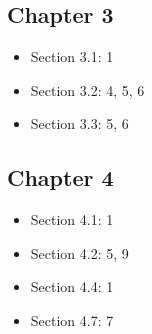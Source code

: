 \documentclass[11pt]{article}
\theoremstyle{definition}
\begin{document}
\subsection{Chapter 3}
\begin{itemize}
  \item Section 3.1: 1
  \item Section 3.2: 4, 5, 6
  \item Section 3.3: 5, 6
\end{itemize}

\subsection{Chapter 4}
\begin{itemize}
  \item Section 4.1: 1
  \item Section 4.2: 5, 9
  \item Section 4.4: 1
  \item Section 4.7: 7
\end{itemize}
\end{document}
